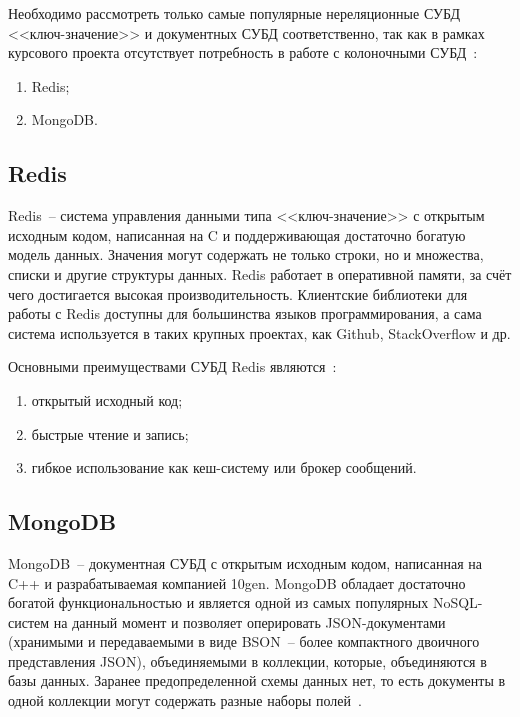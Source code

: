 Необходимо рассмотреть только самые популярные нереляционные СУБД <<ключ-значение>> и документных СУБД соответственно, так как в рамках курсового проекта отсутствует потребность в работе с колоночными СУБД~\cite{popularDB}:
\begin{enumerate}
	\item Redis;
	\item MongoDB.
\end{enumerate}

\subsection{Redis}

Redis~-- система управления данными типа <<ключ-значение>> с открытым исходным кодом, написанная на C и поддерживающая достаточно богатую модель данных.
Значения могут содержать не только строки, но и множества, списки и другие структуры данных.
Redis работает в оперативной памяти, за счёт чего достигается высокая производительность. 
Клиентские библиотеки для работы с Redis доступны для большинства языков программирования, а сама система используется в таких крупных проектах, как Github, StackOverflow и др.

Основными преимуществами СУБД Redis являются~\cite{cmpNosql1}:
\begin{enumerate}
	\item открытый исходный код;
	\item быстрые чтение и запись;
	\item гибкое использование как кеш-систему или брокер сообщений.
\end{enumerate}

\subsection{MongoDB}

MongoDB~-- документная СУБД с открытым исходным кодом, написанная на C++ и разрабатываемая компанией 10gen.
MongoDB обладает достаточно богатой функциональностью и является одной из самых популярных NoSQL-систем на данный момент и позволяет оперировать JSON-документами (хранимыми и передаваемыми в виде BSON~-- более компактного двоичного представления JSON), объединяемыми в коллекции, которые, объединяются в базы данных.
Заранее предопределенной схемы данных нет, то есть документы в одной коллекции могут содержать разные наборы полей~\cite{nosql}.


